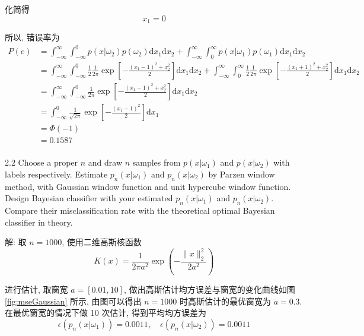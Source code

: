 \documentclass{article}
\begin{document}
化简得
\begin{equation}
  x_1=0
\end{equation}

所以, 错误率为
\begin{equation}
  \begin{aligned}
    P(e)
    &=\int_{-\infty}^\infty\int_{-\infty}^0 p(x|\omega_{2})p(\omega_{2})\mathrm{d}x_1\mathrm{d}x_2+\int_{-\infty}^\infty\int_0^\infty p(x|\omega_{1})p(\omega_{1})\mathrm{d}x_1\mathrm{d}x_2\\
    &=\int_{-\infty}^\infty\int_{-\infty}^0\frac{1}{2}\frac{1}{2\pi}\exp\left[-\frac{(x_1-1)^2+x_2^2}{2}\right]\mathrm{d}x_1\mathrm{d}x_2+\int_{-\infty}^\infty\int_0^\infty\frac{1}{2}\frac{1}{2\pi}\exp\left[-\frac{(x_1+1)^2+x_2^2}{2}\right]\mathrm{d}x_1\mathrm{d}x_2\\
    &=\int_{-\infty}^\infty\int_{-\infty}^0\frac{1}{2\pi}\exp\left[-\frac{(x_1-1)^2+x_2^2}{2}\right]\mathrm{d}x_1\mathrm{d}x_2\\
    &=\int_{-\infty}^0\frac{1}{\sqrt{2\pi}}\exp\left[-\frac{(x_1-1)^2}{2}\right]\mathrm{d}x_1\\
    &=\Phi(-1)\\
    &=0.1587\\
  \end{aligned}
\end{equation}

2.2 Choose a proper $n$ and draw $n$ samples from $p(x|\omega_{1})$ and $p(x|\omega_{2})$ with labels respectively. Estimate $p_{n}(x|\omega_{1})$ and $p_{n}(x|\omega_{2})$ by Parzen window method, with Gaussian window function and unit hypercube window function. Design Bayesian classifier with your estimated $p_{n}(x|\omega_{1})$ and $p_{n}(x|\omega_{2})$. Compare their misclassification rate with the theoretical optimal Bayesian classifier in theory.

解: 取 $n=1000$, 使用二维高斯核函数
\begin{equation}
  K(x)=\frac{1}{2\pi a^2}\exp\left(-\frac{\|x\|_2^2}{2a^2}\right)
\end{equation}

进行估计, 取窗宽 $a=[0.01,10]$, 做出高斯估计均方误差与窗宽的变化曲线如图 \ref{fig:mseGaussian} 所示, 由图可以得出 $n=1000$ 时高斯估计的最优窗宽为 $a=0.3$. 在最优窗宽的情况下做 10 次估计, 得到平均均方误差为
\begin{equation}
  \epsilon(p_n(x|\omega_1))=0.0011,\quad\epsilon(p_n(x|\omega_2))=0.0011
\end{equation}
\end{document}
